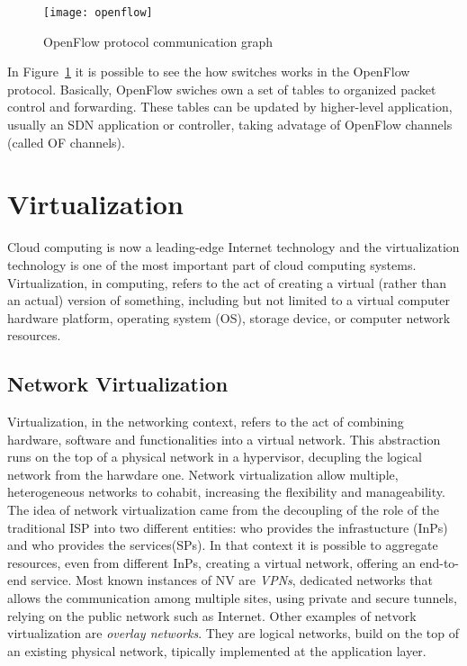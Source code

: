 \begin{figure}[t]
 \centering
 \texttt{[image: openflow]}
 \caption{OpenFlow protocol communication graph}
 \label{chap:background:img:openflow_protocol}
\end{figure}

In Figure~\ref{chap:background:img:openflow_protocol} it is possible to see the
how switches works in the OpenFlow protocol. Basically, OpenFlow swiches own a
set of tables to organized packet control and forwarding. These tables can be
updated by higher-level application, usually an SDN application or controller,
taking advatage of OpenFlow channels (called OF channels). 

\section{Virtualization}
Cloud computing is now a leading-edge Internet technology and the virtualization
technology is one of the most important part of cloud computing systems.
Virtualization, in computing, refers to the act of creating a virtual (rather
than an actual) version of something, including but not limited to a virtual
computer hardware platform, operating system (OS), storage device, or computer
network resources. 

\subsection{Network Virtualization}
Virtualization, in the networking context, refers to the act of combining
hardware, software and functionalities into a virtual network. This abstraction
runs on the top of a physical network in a hypervisor, decupling the logical
network from the harwdare one. Network virtualization allow multiple,
heterogeneous networks to cohabit, increasing the flexibility and manageability.
The idea of network virtualization came from the decoupling of the role of the
traditional ISP into two different entities: who provides the infrastucture
(InPs) and who provides the services(SPs). In that context it is possible to
aggregate resources, even from different InPs, creating a virtual network,
offering an end-to-end service. Most known instances of NV are \emph{VPNs},
dedicated networks that allows the communication among multiple sites, using
private and secure tunnels, relying on the public network such as Internet.
Other examples of netvork virtualization are \emph{overlay networks}. They are
logical networks, build on the top of an existing physical network, tipically
implemented at the application layer. 

